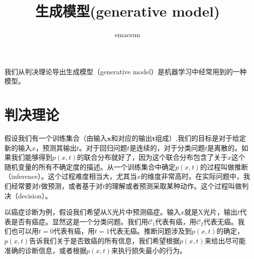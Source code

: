 \documentclass[10pt,a4paper,UTF8]{article}
\author{emacsun}
\date{}
\title{生成模型(generative model)}
\begin{document}
\maketitle
\tableofcontents
{}
我们从判决理论导出生成模型（generative model）是机器学习中经常用到的一种模型。

\section{判决理论}
\label{sec:orgf42d483}


假设我们有一个训练集合（由输入\(\mathbf{x}\)和对应的输出\(\mathbf{t}\)组成）,我们的目标是对于给定新的输入\(x\)，预测其输出\(t\)。对于回归问题\(t\)是连续的，对于分类问题\(t\)是离散的。如果我们能够得到\(p(x,t)\)的联合分布就好了，因为这个联合分布包含了关于\(x\)这个随机变量的所有不确定度的描述。从一个训练集合中确定\(p(x,t)\)的过程叫做推断（inference）。这个过程难度相当大，尤其当\(x\)的维度非常高时。在实际问题中，我们经常要对\(t\)做预测，或者基于对\(t\)的理解或者预测采取某种动作。这个过程叫做判决（decision）。

以癌症诊断为例，假设我们希望从X光片中预测癌症。输入\(x\)就是X光片，输出\(t\)代表是否有癌症。显然这是一个分类问题。我们用\(\mathcal{C}_{1}\)代表有癌，用\(\mathcal{C}_{2}\)代表无癌。我们也可以用\(t=0\)代表有癌，用\(t=1\)代表无癌。推断问题涉及到\(p(x,t)\)的确定，\(p(x,t)\)告诉我们关于是否致癌的所有信息，我们希望根据\(p(x,t)\)来给出尽可能准确的诊断信息，或者根据\(p(x,t)\)来执行损失最小的行为。
\end{document}
